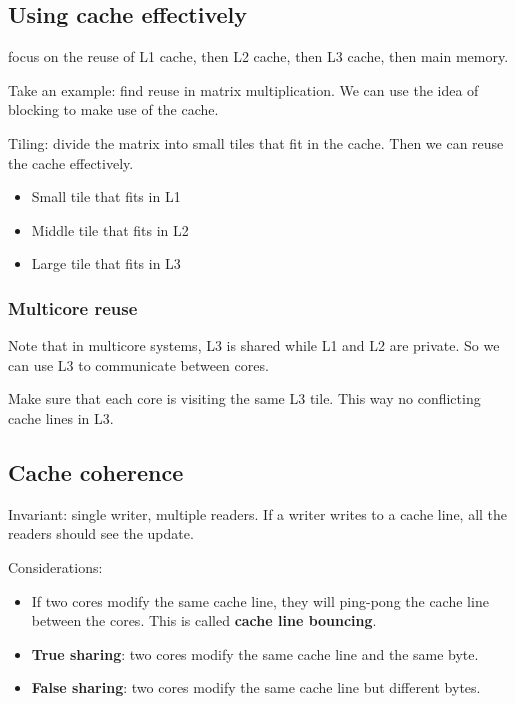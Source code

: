 \documentclass[letterpaper,12pt]{article}
\begin{document}
\subsection{Using cache effectively}
focus on the reuse of L1 cache, then L2 cache, then L3 cache, then main memory.

Take an example: find reuse in matrix multiplication. We can use the idea of blocking to make use of the cache.

Tiling: divide the matrix into small tiles that fit in the cache. Then we can reuse the cache effectively.
\begin{itemize}
    \item Small tile that fits in L1
    \item Middle tile that fits in L2
    \item Large tile that fits in L3
\end{itemize}
\subsubsection{Multicore reuse}
Note that in multicore systems, L3 is shared while L1 and L2 are private. So we can use L3 to communicate between cores.

Make sure that each core is visiting the same L3 tile. This way no conflicting cache lines in L3. 
\subsection{Cache coherence}
Invariant: single writer, multiple readers. If a writer writes to a cache line, all the readers should see the update.

Considerations: \begin{itemize}
    \item If two cores modify the same cache line, they will ping-pong the cache line between the cores. This is called \textbf{cache line bouncing}.
    \item \textbf{True sharing}: two cores modify the same cache line and the same byte.
    \item \textbf{False sharing}: two cores modify the same cache line but different bytes.
\end{itemize}
\end{document}
